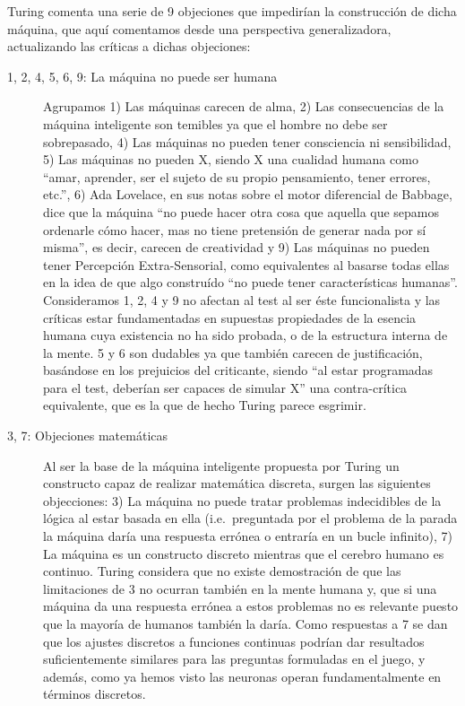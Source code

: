 \documentclass[12pt]{memoir}
\begin{document}
Turing comenta una serie de 9 objeciones que impedirían la construcción de dicha máquina, que aquí comentamos desde una perspectiva generalizadora, actualizando las críticas a dichas objeciones:

\begin{description}
	\item[1, 2, 4, 5, 6, 9: La máquina no puede ser humana] Agrupamos 1) Las máquinas carecen de alma, 2) Las consecuencias de la máquina inteligente son temibles ya que el hombre no debe ser sobrepasado, 4) Las máquinas no pueden tener consciencia ni sensibilidad, 5) Las máquinas no pueden X, siendo X una cualidad humana como ``amar, aprender, ser el sujeto de su propio pensamiento, tener errores, etc.'', 6) Ada Lovelace, en sus notas sobre el motor diferencial de Babbage, dice que la máquina ``no puede hacer otra cosa que aquella que sepamos ordenarle cómo hacer, mas no tiene pretensión de generar nada por sí misma'', es decir, carecen de creatividad y 9) Las máquinas no pueden tener Percepción Extra-Sensorial, como equivalentes al basarse todas ellas en la idea de que algo construído ``no puede tener características humanas''. Consideramos 1, 2, 4 y 9 no afectan al test al ser éste funcionalista y las críticas estar fundamentadas en supuestas propiedades de la esencia humana cuya existencia no ha sido probada, o de la estructura interna de la mente. 5 y 6 son dudables ya que también carecen de justificación, basándose en los prejuicios del criticante, siendo ``al estar programadas para el test, deberían ser capaces de simular X'' una contra-crítica equivalente, que es la que de hecho Turing parece esgrimir.
	\item[3, 7: Objeciones matemáticas] Al ser la base de la máquina inteligente propuesta por Turing un constructo capaz de realizar matemática discreta, surgen las siguientes objecciones: 3) La máquina no puede tratar problemas indecidibles de la lógica al estar basada en ella (i.e.\ preguntada por el problema de la parada la máquina daría una respuesta errónea o entraría en un bucle infinito), 7) La máquina es un constructo discreto mientras que el cerebro humano es continuo. Turing considera que no existe demostración de que las limitaciones de 3 no ocurran también en la mente humana y, que si una máquina da una respuesta errónea a estos problemas no es relevante puesto que la mayoría de humanos también la daría. Como respuestas a 7 se dan que los ajustes discretos a funciones continuas podrían dar resultados suficientemente similares para las preguntas formuladas en el juego, y además, como ya hemos visto las neuronas operan fundamentalmente en términos discretos.

\end{description}
\end{document}
